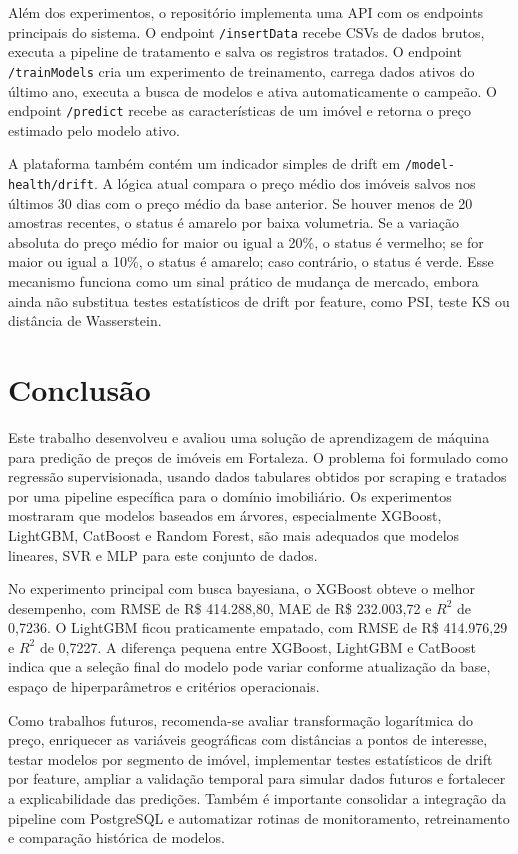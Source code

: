 \documentclass[12pt,a4paper]{article}
\begin{document}
Além dos experimentos, o repositório implementa uma API com os endpoints principais do sistema. O endpoint \texttt{/insertData} recebe CSVs de dados brutos, executa a pipeline de tratamento e salva os registros tratados. O endpoint \texttt{/trainModels} cria um experimento de treinamento, carrega dados ativos do último ano, executa a busca de modelos e ativa automaticamente o campeão. O endpoint \texttt{/predict} recebe as características de um imóvel e retorna o preço estimado pelo modelo ativo.

A plataforma também contém um indicador simples de drift em \texttt{/model-health/drift}. A lógica atual compara o preço médio dos imóveis salvos nos últimos 30 dias com o preço médio da base anterior. Se houver menos de 20 amostras recentes, o status é amarelo por baixa volumetria. Se a variação absoluta do preço médio for maior ou igual a 20\%, o status é vermelho; se for maior ou igual a 10\%, o status é amarelo; caso contrário, o status é verde. Esse mecanismo funciona como um sinal prático de mudança de mercado, embora ainda não substitua testes estatísticos de drift por feature, como PSI, teste KS ou distância de Wasserstein.

\section{Conclusão}

Este trabalho desenvolveu e avaliou uma solução de aprendizagem de máquina para predição de preços de imóveis em Fortaleza. O problema foi formulado como regressão supervisionada, usando dados tabulares obtidos por scraping e tratados por uma pipeline específica para o domínio imobiliário. Os experimentos mostraram que modelos baseados em árvores, especialmente XGBoost, LightGBM, CatBoost e Random Forest, são mais adequados que modelos lineares, SVR e MLP para este conjunto de dados.

No experimento principal com busca bayesiana, o XGBoost obteve o melhor desempenho, com RMSE de R\$ 414.288,80, MAE de R\$ 232.003,72 e $R^2$ de 0,7236. O LightGBM ficou praticamente empatado, com RMSE de R\$ 414.976,29 e $R^2$ de 0,7227. A diferença pequena entre XGBoost, LightGBM e CatBoost indica que a seleção final do modelo pode variar conforme atualização da base, espaço de hiperparâmetros e critérios operacionais.

Como trabalhos futuros, recomenda-se avaliar transformação logarítmica do preço, enriquecer as variáveis geográficas com distâncias a pontos de interesse, testar modelos por segmento de imóvel, implementar testes estatísticos de drift por feature, ampliar a validação temporal para simular dados futuros e fortalecer a explicabilidade das predições. Também é importante consolidar a integração da pipeline com PostgreSQL e automatizar rotinas de monitoramento, retreinamento e comparação histórica de modelos.
\end{document}
